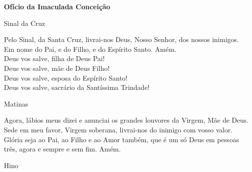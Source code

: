 \documentclass{book}
\begin{document}
\newpage
\begin{center}
    \textbf{Ofício da Imaculada Conceição}
\end{center}
\begin{center}
    Sinal da Cruz
\end{center}
\begin{flushleft}
    Pelo Sinal, \grecrossRed{} da Santa Cruz, livrai-nos Deus, \grecrossRed{} Nosso Senhor, dos nossos \grecrossRed{} inimigos. Em nome do Pai, \grecrossRed{} e do Filho, e do Espírito Santo. Amém.
    \vspace{.2cm} \\
    Deus vos salve, filha de Deus Pai! \\
    Deus vos salve, mãe de Deus Filho! \\
    Deus vos salve, esposa do Espírito Santo! \\
    Deus vos salve, sacrário da Santíssima Trindade!
\end{flushleft}
\begin{center}
    Matinas
\end{center}
\begin{flushleft}
    Agora, lábios meus dizei e anunciai os grandes louvores da Virgem, Mãe de Deus. Sede em meu favor, Virgem soberana, livrai-nos do inimigo com vosso valor. Glória seja ao Pai, ao Filho e ao Amor também, que é um só Deus em pessoas três, agora e sempre e sem fim. Amém.
\end{flushleft}
\begin{center}
    \textcolor{VioletRed2}{Hino}
\end{center}
\end{document}

